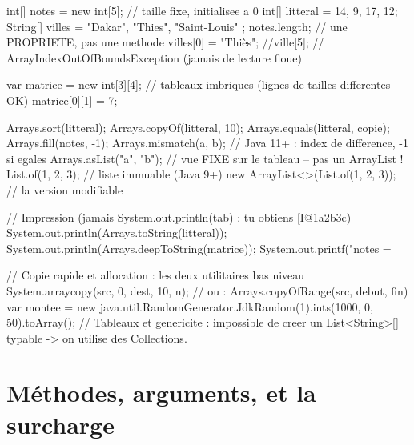 \begin{codejava}
int[] notes = new int[5];                 // taille fixe, initialisee a 0
int[] litteral = {14, 9, 17, 12};
String[] villes = { "Dakar", "Thies", "Saint-Louis" };
notes.length;                              // une PROPRIETE, pas une methode
villes[0] = "Thi\`es";
//ville[5];                                 // ArrayIndexOutOfBoundsException (jamais de lecture floue)

var matrice = new int[3][4];               // tableaux imbriques (lignes de tailles differentes OK)
matrice[0][1] = 7;

Arrays.sort(litteral);
Arrays.copyOf(litteral, 10);
Arrays.equals(litteral, copie);
Arrays.fill(notes, -1);
Arrays.mismatch(a, b);                      // Java 11+ : index de difference, -1 si egales
Arrays.asList("a", "b");                    // vue FIXE sur le tableau -- pas un ArrayList !
List.of(1, 2, 3);                            // liste immuable (Java 9+)
new ArrayList<>(List.of(1, 2, 3));           // la version modifiable

// Impression (jamais System.out.println(tab) : tu obtiens [I@1a2b3c)
System.out.println(Arrays.toString(litteral));
System.out.println(Arrays.deepToString(matrice));
System.out.printf("notes = %

// Copie rapide et allocation : les deux utilitaires bas niveau
System.arraycopy(src, 0, dest, 10, n);     // ou : Arrays.copyOfRange(src, debut, fin)
var montee = new java.util.RandomGenerator.JdkRandom(1).ints(1000, 0, 50).toArray();
// Tableaux et genericite : impossible de creer un List<String>[] typable -> on utilise des Collections.
\end{codejava}

\section{M\'ethodes, arguments, et la surcharge}

